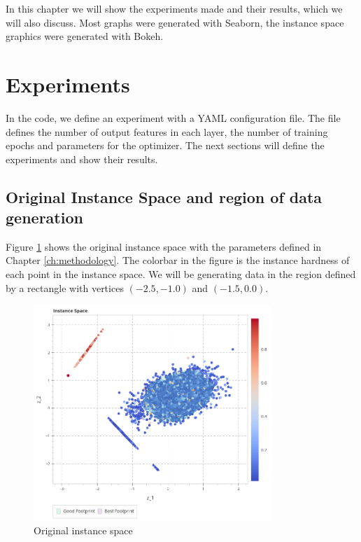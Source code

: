 In this chapter we will show the experiments made and their results, which we will also discuss. Most graphs were generated with Seaborn, the instance space graphics were generated with Bokeh.

\section{Experiments} \label{sec:experiments}

In the code, we define an experiment with a YAML configuration file. The file defines the number of output features in each layer, the number of training epochs and parameters for the optimizer. The next sections will define the experiments and show their results.

\subsection{Original Instance Space and region of data generation}

Figure \ref{fig:is_original} shows the original instance space with the parameters defined in Chapter \ref{ch:methodology}. The colorbar in the figure is the instance hardness of each point in the instance space. We will be generating data in the region defined by a rectangle with vertices $(-2.5, -1.0)$ and $(-1.5, 0.0)$.

\begin{figure}[H]
    \centering
    \includegraphics[width=0.8\textwidth]{Cap5/is_original.png}
    \caption{Original instance space}
    \label{fig:is_original}
\end{figure}

